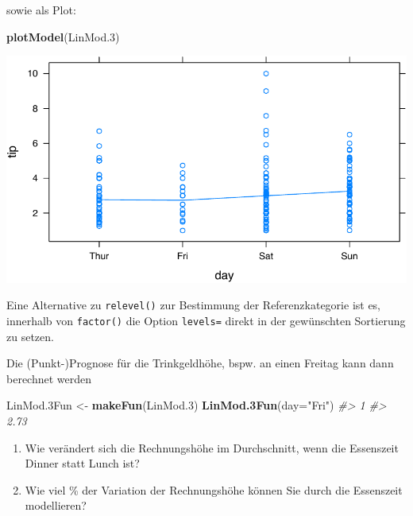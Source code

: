 \documentclass[12pt,]{book}
\newenvironment{Shaded}{\begin{snugshade}}{\end{snugshade}}
\newcommand{\KeywordTok}[1]{\textcolor[rgb]{0.13,0.29,0.53}{\textbf{{#1}}}}
\newcommand{\DataTypeTok}[1]{\textcolor[rgb]{0.13,0.29,0.53}{{#1}}}
\newcommand{\FloatTok}[1]{\textcolor[rgb]{0.00,0.00,0.81}{{#1}}}
\newcommand{\StringTok}[1]{\textcolor[rgb]{0.31,0.60,0.02}{{#1}}}
\newcommand{\CommentTok}[1]{\textcolor[rgb]{0.56,0.35,0.01}{\textit{{#1}}}}
\newcommand{\NormalTok}[1]{{#1}}
\providecommand{\tightlist}{%
  \setlength{\itemsep}{0pt}\setlength{\parskip}{0pt}}
\let\BeginKnitrBlock\begin \let\EndKnitrBlock\end
\begin{document}
sowie als Plot:

\begin{Shaded}
\begin{Highlighting}[]
\KeywordTok{plotModel}\NormalTok{(LinMod}\FloatTok{.3}\NormalTok{)}
\end{Highlighting}
\end{Shaded}

\begin{center}\includegraphics[width=0.7\linewidth]{071_Regression_files/figure-latex/unnamed-chunk-16-1} \end{center}

Eine Alternative zu \texttt{relevel()} zur Bestimmung der
Referenzkategorie ist es, innerhalb von \texttt{factor()} die Option
\texttt{levels=} direkt in der gewünschten Sortierung zu setzen.

\begin{Shaded}
\end{Shaded}

Die (Punkt-)Prognose für die Trinkgeldhöhe, bspw. an einen Freitag kann
dann berechnet werden

\begin{Shaded}
\begin{Highlighting}[]
\NormalTok{LinMod.3Fun <-}\StringTok{ }\KeywordTok{makeFun}\NormalTok{(LinMod}\FloatTok{.3}\NormalTok{)}
\KeywordTok{LinMod.3Fun}\NormalTok{(}\DataTypeTok{day=}\StringTok{"Fri"}\NormalTok{)}
\CommentTok{#>    1 }
\CommentTok{#> 2.73}
\end{Highlighting}
\end{Shaded}

\BeginKnitrBlock{rmdexercises}
\begin{enumerate}
\def\labelenumi{\arabic{enumi}.}
\setcounter{enumi}{2}
\tightlist
\item
  Wie verändert sich die Rechnungshöhe im Durchschnitt, wenn die
  Essenszeit Dinner statt Lunch ist?
\item
  Wie viel \% der Variation der Rechnungshöhe können Sie durch die
  Essenszeit modellieren?
\end{enumerate}
\EndKnitrBlock{rmdexercises}
\end{document}
